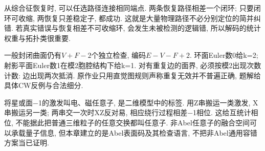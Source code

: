 从综合征恢复时, 可以任选路径连接相同端点. 两条恢复路径相差一个闭环; 只要闭环可收缩, 两恢复只差稳定子, 都成功. 这就是大量物理路径不必分别定位的简并纠错. 若真实错误与恢复相差不可收缩环, 会发生未被检测的逻辑错, 所以解码的统计权重与拓扑类很重要.

一般封闭曲面仍有$V+F-2$个独立检查, 编码$E-V-F+2$. 环面Euler数0给k=2; 射影平面Euler数1在模2胞腔结构下给k=1. 对有重复边的面界, 必须按模2出现次数计数: 边出现两次抵消. 原作业只用直觉图规则声称重复无效并不普遍正确, 题解给具体CW反例与合法细分.

将星或面−1的激发叫电、磁任意子, 是二维模型中的标签. 用Z串搬运一类激发, X串搬运另一类; 两串交一次时XZ反对易, 相应绕行过程相差−1相位. 这给互统计相位, 不能据此把普通三维粒子的任意交换都叫任意子. 非Abel任意子的融合空间可以承载量子信息, 但本章建立的是Abel表面码及其检查语言, 不把非Abel通用容错方案当已证明.
